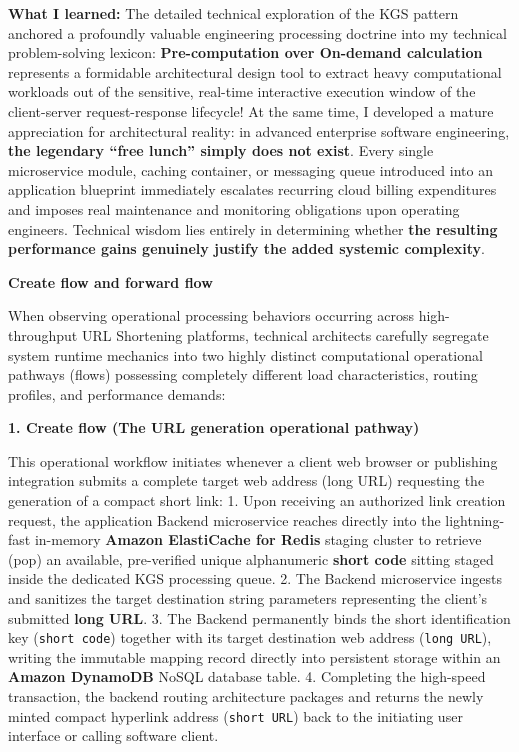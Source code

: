 \textbf{What I learned:} The detailed technical exploration of the KGS
pattern anchored a profoundly valuable engineering processing doctrine
into my technical problem-solving lexicon: \textbf{Pre-computation over
On-demand calculation} represents a formidable architectural design tool
to extract heavy computational workloads out of the sensitive, real-time
interactive execution window of the client-server request-response
lifecycle! At the same time, I developed a mature appreciation for
architectural reality: in advanced enterprise software engineering,
\textbf{the legendary ``free lunch'' simply does not exist}. Every
single microservice module, caching container, or messaging queue
introduced into an application blueprint immediately escalates recurring
cloud billing expenditures and imposes real maintenance and monitoring
obligations upon operating engineers. Technical wisdom lies entirely in
determining whether \textbf{the resulting performance gains genuinely
justify the added systemic complexity}.

\vspace{0.5em}\noindent\textbf{Create flow and forward
flow}\par

When observing operational processing behaviors occurring across
high-throughput URL Shortening platforms, technical architects carefully
segregate system runtime mechanics into two highly distinct
computational operational pathways (flows) possessing completely
different load characteristics, routing profiles, and performance
demands:

\vspace{0.5em}\noindent\textbf{1. Create flow (The URL generation operational
pathway)}\par

This operational workflow initiates whenever a client web browser or
publishing integration submits a complete target web address (long URL)
requesting the generation of a compact short link: 1. Upon receiving an
authorized link creation request, the application Backend microservice
reaches directly into the lightning-fast in-memory \textbf{Amazon
ElastiCache for Redis} staging cluster to retrieve (pop) an available,
pre-verified unique alphanumeric \textbf{short code} sitting staged
inside the dedicated KGS processing queue. 2. The Backend microservice
ingests and sanitizes the target destination string parameters
representing the client's submitted \textbf{long URL}. 3. The Backend
permanently binds the short identification key (\texttt{short\ code})
together with its target destination web address (\texttt{long\ URL}),
writing the immutable mapping record directly into persistent storage
within an \textbf{Amazon DynamoDB} NoSQL database table. 4. Completing
the high-speed transaction, the backend routing architecture packages
and returns the newly minted compact hyperlink address
(\texttt{short\ URL}) back to the initiating user interface or calling
software client.

